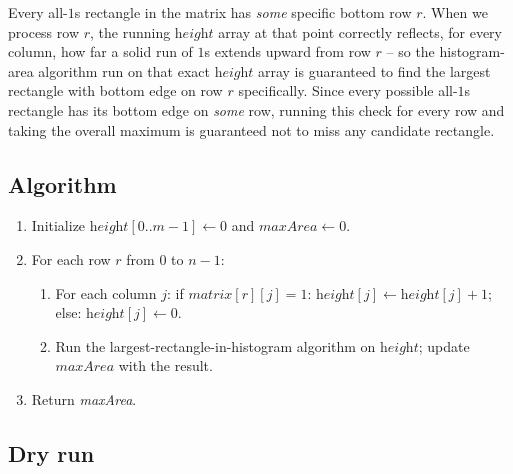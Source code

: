 Every all-$1$s rectangle in the matrix has \emph{some} specific bottom
row $r$. When we process row $r$, the running $\textit{height}$ array at
that point correctly reflects, for every column, how far a solid run of
$1$s extends upward from row $r$ -- so the histogram-area algorithm run on
that exact $\textit{height}$ array is guaranteed to find the largest
rectangle with bottom edge on row $r$ specifically. Since every possible
all-$1$s rectangle has its bottom edge on \emph{some} row, running this
check for every row and taking the overall maximum is guaranteed not to
miss any candidate rectangle.

\subsection*{Algorithm}

\begin{enumerate}
  \item Initialize $\textit{height}[0..m-1] \gets 0$ and
        $\textit{maxArea} \gets 0$.
  \item For each row $r$ from $0$ to $n-1$:
  \begin{enumerate}
    \item For each column $j$: if $\textit{matrix}[r][j] = 1$:
          $\textit{height}[j] \gets \textit{height}[j]+1$; else:
          $\textit{height}[j] \gets 0$.
    \item Run the largest-rectangle-in-histogram algorithm on
          $\textit{height}$; update $\textit{maxArea}$ with the result.
  \end{enumerate}
  \item Return \textit{maxArea}.
\end{enumerate}

\subsection*{Dry run}


